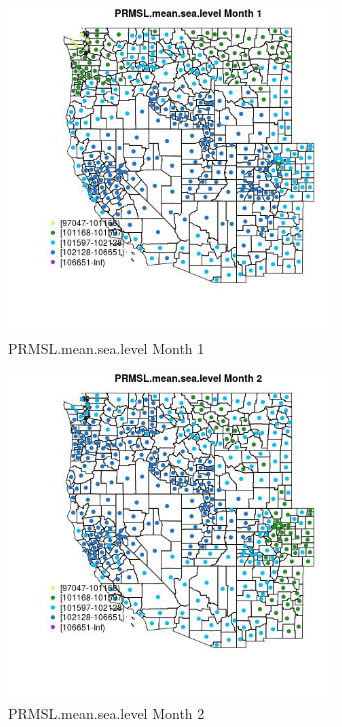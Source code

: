 \begin{figure} 
\centering  
\includegraphics[width=0.77\textwidth]{Code_Outputs/df_report_ML_predictors_CountyCentroid_Locations_Dates_2008-01-01to2018-12-31_MapObsMo1PRMSLmeansealevel.jpg} 
\caption{\label{fig:df_report_ML_predictors_CountyCentroid_Locations_Dates_2008-01-01to2018-12-31MapObsMo1PRMSLmeansealevel}PRMSL.mean.sea.level Month 1} 
\end{figure} 
 

\begin{figure} 
\centering  
\includegraphics[width=0.77\textwidth]{Code_Outputs/df_report_ML_predictors_CountyCentroid_Locations_Dates_2008-01-01to2018-12-31_MapObsMo2PRMSLmeansealevel.jpg} 
\caption{\label{fig:df_report_ML_predictors_CountyCentroid_Locations_Dates_2008-01-01to2018-12-31MapObsMo2PRMSLmeansealevel}PRMSL.mean.sea.level Month 2} 
\end{figure} 
 

